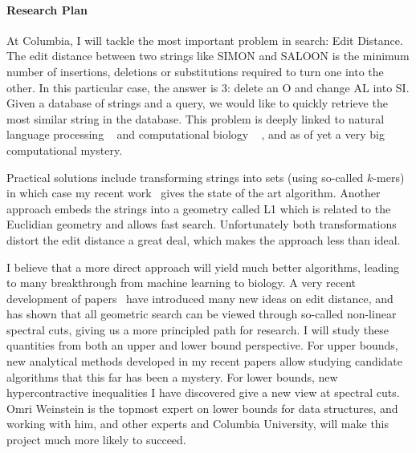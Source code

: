 \documentclass[10pt]{article}
\begin{document}

\paragraph{Research Plan}

At Columbia, I will tackle the most important problem in search: Edit Distance.
The edit distance between two strings like SIMON and SALOON is the minimum number of insertions, deletions or substitutions required to turn one into the other.
In this particular case, the answer is 3: delete an O and change AL into SI.
Given a database of strings and a query, we would like to quickly retrieve the most similar string in the database.
This problem is deeply linked to natural language processing
~\cite{sidorov2015computing}
and computational biology
~\cite{mcgrane2016biological}
, and as of yet a very big computational mystery.

Practical solutions include transforming strings into sets (using so-called $k$-mers) in which case my recent work~\cite{ahle2019subsets} gives the state of the art algorithm.
Another approach embeds the strings into a geometry called L1
which is related to the Euclidian geometry and allows fast search.
Unfortunately both transformations distort the edit distance a great deal, which makes the approach less than ideal.

I believe that a more direct approach will yield much better algorithms, leading to many breakthrough from machine learning to biology.
A very recent development of papers~\cite{
   chakraborty2018approximating,
   haeupler2019near%
}
have introduced many new ideas on edit distance,
and~\cite{andoni2018data} has shown that all geometric search can be viewed through so-called non-linear spectral cuts, giving us a more principled path for research.
I will study these quantities from both an upper and lower bound perspective.
For upper bounds, new analytical methods developed in my recent papers allow studying candidate algorithms that this far has been a mystery.
For lower bounds, new hypercontractive inequalities I have discovered give a new view at spectral cuts.
Omri Weinstein is the topmost expert on lower bounds for data structures, and working with him, and other experts and Columbia University, will make this project much more likely to succeed.

\clearpage
\phantom{,}
\vspace{1cm}


\end{document}
